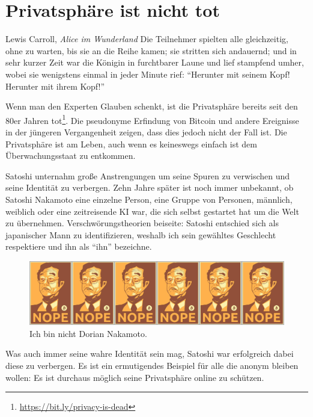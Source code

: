 \chapter{Privatsphäre ist nicht tot}
\label{les:19}

\begin{chapquote}{Lewis Carroll, \textit{Alice im Wunderland}}
Die Teilnehmer spielten alle gleichzeitig, ohne zu warten, bis sie an die Reihe
kamen; sie stritten sich andauernd; und in sehr kurzer Zeit war die Königin in
furchtbarer Laune und lief stampfend umher, wobei sie wenigstens einmal in jeder
Minute rief: \enquote{Herunter mit seinem Kopf! Herunter mit ihrem Kopf!}
\end{chapquote}

Wenn man den Experten Glauben schenkt, ist die Privatsphäre bereits seit den 80er
Jahren tot\footnote{\url{https://bit.ly/privacy-is-dead}}. Die pseudonyme
Erfindung von Bitcoin und andere Ereignisse in der jüngeren Vergangenheit zeigen,
dass dies jedoch nicht der Fall ist. Die Privatsphäre ist am Leben, auch wenn es
keineswegs einfach ist dem Überwachungsstaat zu entkommen.

Satoshi unternahm große Anstrengungen um seine Spuren zu verwischen und seine
Identität zu verbergen. Zehn Jahre später ist noch immer unbekannt, ob Satoshi
Nakamoto eine einzelne Person, eine Gruppe von Personen, männlich, weiblich oder
eine zeitreisende KI war, die sich selbst gestartet hat um die Welt zu
übernehmen. Verschwörungstheorien beiseite: Satoshi entschied sich als
japanischer Mann zu identifizieren, weshalb ich sein gewähltes Geschlecht
respektiere und ihn als \enquote{ihn} bezeichne.

\begin{figure}
  \includegraphics{assets/images/nope.png}
  \caption{Ich bin nicht Dorian Nakamoto.}
  \label{fig:nope}
\end{figure}

\newpage

Was auch immer seine wahre Identität sein mag, Satoshi war erfolgreich dabei
diese zu verbergen. Es ist ein ermutigendes Beispiel für alle die anonym bleiben
wollen: Es ist durchaus möglich seine Privatsphäre online zu schützen.

